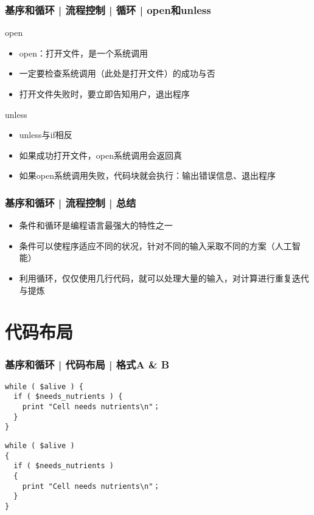 \begin{frame}
  \frametitle{基序和循环 | 流程控制 | 循环 | \alert{open和unless}}
  \begin{block}{open}
    \begin{itemize}
      \item open：打开文件，是一个系统调用
      \item 一定要检查系统调用（此处是打开文件）的成功与否
      \item 打开文件失败时，要立即告知用户，退出程序
    \end{itemize}
  \end{block}
  \pause
  \begin{block}{unless}
    \begin{itemize}
      \item unless与if相反
      \item 如果成功打开文件，open系统调用会返回真
      \item 如果open系统调用失败，代码块就会执行：输出错误信息、退出程序
    \end{itemize}
  \end{block}
\end{frame}

\begin{frame}
  \frametitle{基序和循环 | 流程控制 | 总结}
  \begin{itemize}
    \item 条件和循环是编程语言最强大的特性之一
    \item 条件可以使程序适应不同的状况，针对不同的输入采取不同的方案（人工智能）
    \item 利用循环，仅仅使用几行代码，就可以处理大量的输入，对计算进行重复迭代与提炼
  \end{itemize}
\end{frame}

\section{代码布局}
\begin{frame}[fragile]
  \frametitle{基序和循环 | 代码布局 | 格式A \& B}
\begin{lstlisting}
while ( $alive ) {
  if ( $needs_nutrients ) {
    print "Cell needs nutrients\n"；
  }
}
\end{lstlisting}
\pause
\begin{lstlisting}
while ( $alive )
{
  if ( $needs_nutrients )
  {
    print "Cell needs nutrients\n"；
  }
}
\end{lstlisting}
\end{frame}

